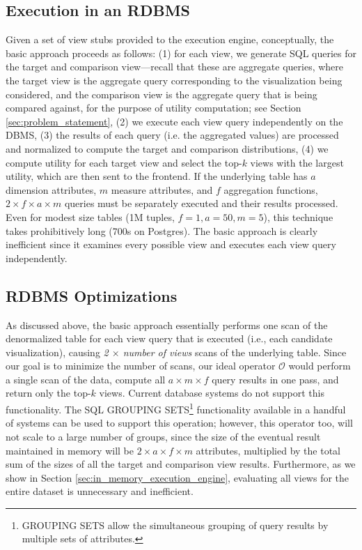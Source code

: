 \subsection{Execution in an RDBMS}
\label{sec:basic_framework}
Given a set of view stubs provided to the execution engine, conceptually,
the basic approach proceeds as follows:
(1) for each view, we generate SQL queries for the target and
comparison view---recall that these are aggregate queries, where
the target view is the aggregate query corresponding 
to the visualization being considered, and the comparison
view is the aggregate query that is being compared against,
for the purpose of utility computation;
see Section \ref{sec:problem_statement}, 
(2) we execute each view query independently on the DBMS, 
(3) the results of each query (i.e. the aggregated values) are processed and
normalized to compute the target and comparison distributions, 
(4) we compute utility for each target view 
and select the top-$k$ views with the largest utility,
which are then sent to the frontend.
If the underlying table has $a$ dimension attributes, $m$ measure attributes,
and $f$ aggregation functions, 
$2\times f \times a \times  m$ queries must be separately executed and their results
processed. Even for modest size tables (1M tuples, $f = 1, a = 50, m=5$), this
technique takes prohibitively long (700s on Postgres). The basic approach is
clearly inefficient since it examines every possible view and executes each view
query independently.

\subsection{RDBMS Optimizations} 
\label{sec:dbms_optimizations}
As discussed above, the basic approach essentially 
performs one scan of the denormalized table for each
view query that is executed (i.e., each candidate visualization), 
causing {\it 2 $\times$ number of views} scans of the
underlying table. Since our goal is to minimize the number of scans, our ideal
operator $\mathcal{O}$ would perform a single scan of the data, compute all
$a \times m \times f$ query results in one pass, 
and return only the top-$k$ views.
Current database systems do not support this functionality. 
The SQL GROUPING SETS\footnote{GROUPING SETS allow the simultaneous
grouping of query results by multiple sets of attributes.} functionality
available in a handful of systems can be used to support this operation;
however, this operator too, will not scale to a large number of groups,
since the size of the eventual result maintained in memory will be
$2 \times a \times f \times m$ attributes, 
multiplied by the total sum of the sizes of all the target
and comparison view results. 
Furthermore, as we show in Section \ref{sec:in_memory_execution_engine}, evaluating all
views for the entire dataset is unnecessary and inefficient.

